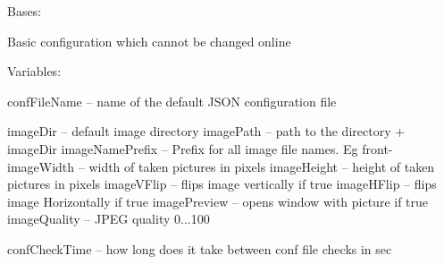 \documentclass[letterpaper,10pt,english]{sphinxmanual}
\begin{document}
\begin{fulllineitems}
\label{rpicameramon:rpicameramon.config.BaseConfig}
Bases: 

Basic configuration which cannot be changed online

Variables:

confFileName -- name of the default JSON configuration file

imageDir -- default image directory
imagePath -- path to the directory + imageDir
imageNamePrefix -- Prefix for all image file names. Eg front-
imageWidth -- width of taken pictures in pixels
imageHeight -- height of taken pictures in pixels
imageVFlip -- flips image vertically if true
imageHFlip -- flips image Horizontally if true
imagePreview -- opens window with picture if true
imageQuality -- JPEG quality 0...100

confCheckTime -- how long does it take between conf file checks in sec

\begin{fulllineitems}
\label{rpicameramon:rpicameramon.config.BaseConfig.GSMPIN}
\end{fulllineitems}


\begin{fulllineitems}
\label{rpicameramon:rpicameramon.config.BaseConfig.GSMbaud}
\end{fulllineitems}


\begin{fulllineitems}
\label{rpicameramon:rpicameramon.config.BaseConfig.GSMport}
\end{fulllineitems}


\begin{fulllineitems}
\label{rpicameramon:rpicameramon.config.BaseConfig.LEDpin}
\end{fulllineitems}


\end{fulllineitems}
\end{document}
